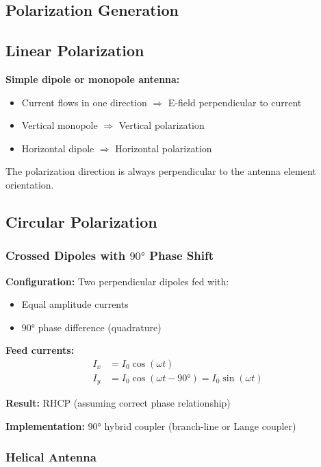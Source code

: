 \begin{center}
\section{Polarization Generation}

\subsection{Linear Polarization}

\textbf{Simple dipole or monopole antenna:}
\begin{itemize}
\item Current flows in one direction $\Rightarrow$ E-field perpendicular to current
\item Vertical monopole $\Rightarrow$ Vertical polarization
\item Horizontal dipole $\Rightarrow$ Horizontal polarization
\end{itemize}

The polarization direction is always perpendicular to the antenna element orientation.

\subsection{Circular Polarization}

\subsubsection{Crossed Dipoles with $90°$ Phase Shift}

\textbf{Configuration:} Two perpendicular dipoles fed with:
\begin{itemize}
\item Equal amplitude currents
\item $90°$ phase difference (quadrature)
\end{itemize}

\textbf{Feed currents:}
\begin{align}
I_x &= I_0 \cos(\omega t) \label{eq:ix-feed} \\
I_y &= I_0 \cos(\omega t - 90°) = I_0 \sin(\omega t) \label{eq:iy-feed}
\end{align}

\textbf{Result:} RHCP (assuming correct phase relationship)

\textbf{Implementation:} $90°$ hybrid coupler (branch-line or Lange coupler)

\subsubsection{Helical Antenna}


\end{center}
